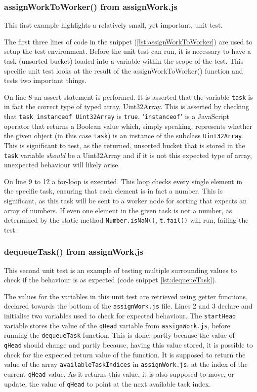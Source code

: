\subsubsection{assignWorkToWorker() from assignWork.js}
This first example highlights a relatively small, yet important, unit test. 

The first three lines of code in the snippet (\ref{lst:assignWorkToWorker}) are used to setup the test environment. Before the unit test can run, it is necessary to have a task (unsorted bucket) loaded into a variable within the scope of the test. This specific unit test looks at the result of the assignWorkToWorker() function and tests two important things. 

On line 8 an assert statement is performed. It is asserted that the variable \lstinline{task} is in fact the correct type of typed array, Uint32Array. This is asserted by checking that \lstinline{task instanceof Uint32Array} is \lstinline{true}. "\lstinline{instanceof}" is a JavaScript operator that returns a Boolean value which, simply speaking, represents whether the given object (in this case \lstinline{task}) is an instance of the subclass \lstinline{Uint32Array}. This is significant to test, as the returned, unsorted bucket that is stored in the \lstinline{task} variable \emph{should} be a Uint32Array and if it is not this expected type of array, unexpected behaviour will likely arise.

On line 9 to 12 a for-loop is executed. This loop checks every single element in the specific task, ensuring that each element is in fact a number. This is significant, as this task will be sent to a worker node for sorting that expects an array of numbers. If even one element in the given task is not a number, as determined by the static method \lstinline{Number.isNaN()}, \lstinline{t.fail()} will run, failing the test.

\subsubsection{dequeueTask() from assignWork.js}
This second unit test is an example of testing multiple surrounding values to check if the behaviour is as expected (code snippet \ref{lst:dequeueTask}). 

The values for the variables in this unit test are retrieved using getter functions, declared towards the bottom of the \lstinline{assignWork.js} file. Lines 2 and 3 declare and initialise two variables used to check for expected behaviour. The \lstinline{startHead} variable stores the value of the \lstinline{qHead} variable from \lstinline{assignWork.js}, before running the \lstinline{dequeueTask} function. This is done, partly because the value of \lstinline{qHead} should change and partly because, having this value stored, it is possible to check for the expected return value of the function. It is supposed to return the value of the array \lstinline{availableTaskIndices} in \lstinline{assignWork.js}, at the index of the current \lstinline{qHead} value. As it returns this value, it is also supposed to move, or update, the value of \lstinline{qHead} to point at the next available task index. 

